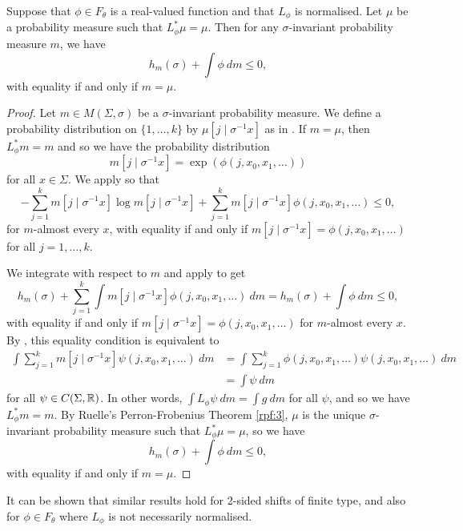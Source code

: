 \begin{lemma} \label{lem:pp-prop-3-4}
	Suppose that $\phi \in F_\theta$ is a real-valued function and that $L_\phi$ is normalised. Let $\mu$ be a probability measure such that $L_\phi^*{\mu} = \mu$. Then for any $\sigma$-invariant probability measure $m$, we have
	\[
		h_m(\sigma) + \int{\phi\ dm} \leq 0,
	\]
	with equality if and only if $m = \mu$.
	\begin{proof}
		Let $m \in M(\Sigma, \sigma)$ be a $\sigma$-invariant probability measure. We define a probability distribution on $\{1, \dots, k\}$ by $\mu[j \mid \sigma^{-1}{x}]$ as in . If $m = \mu$, then $L_\phi^*{m} = m$ and so we have the probability distribution
		\[
			m[j \mid \sigma^{-1}{x}] = \exp(\phi(j, x_0, x_1, \dots))
		\]
		for all $x \in \Sigma$. We apply  so that
		\[
			-\sum_{j = 1}^k{m[j \mid \sigma^{-1}{x}] \log{m[j \mid \sigma^{-1}{x}]}} + \sum_{j = 1}^k{m[j \mid \sigma^{-1}{x}] \phi(j, x_0, x_1, \dots)} \leq 0,
		\]
		for $m$-almost every $x$, with equality if and only if $m[j \mid \sigma^{-1}{x}] = \phi(j, x_0, x_1, \dots)$ for all $j = 1, \dots, k$.
		
		We integrate with respect to $m$ and apply  to get
		\[
			h_m(\sigma) + \sum_{j = 1}^k{\int{m[j \mid \sigma^{-1}{x}] \phi(j, x_0, x_1, \dots)\ dm}} = h_m(\sigma) + \int{\phi\ dm} \leq 0,
		\]
		with equality if and only if $m[j \mid \sigma^{-1}{x}] = \phi(j, x_0, x_1, \dots)$ for $m$-almost every $x$. By , this equality condition is equivalent to
		\begin{align*}
			\int{\sum_{j = 1}^k{m[j \mid \sigma^{-1}{x}] \psi(j, x_0, x_1, \dots)}\ dm} &= \int{\sum_{j = 1}^k{\phi(j, x_0, x_1, \dots) \psi(j, x_0, x_1, \dots)}\ dm} \\
				&= \int{\psi\ dm}
		\end{align*}
		for all $\psi \in C(\Sigma, \mathbb{R})$. In other words, $\int{L_\phi{\psi}\ dm} = \int{g\ dm}$ for all $\psi$, and so we have $L_\phi^*{m} = m$. By Ruelle's Perron-Frobenius Theorem \ref{rpf:3}, $\mu$ is the unique $\sigma$-invariant probability measure such that $L_\phi^*{\mu} = \mu$, so we have
		\[
			h_m(\sigma) + \int{\phi\ dm} \leq 0,
		\]
		with equality if and only if $m = \mu$.
	\end{proof}
\end{lemma}

It can be shown that similar results hold for 2-sided shifts of finite type, and also for $\phi \in F_\theta$ where $L_\phi$ is not necessarily normalised.

